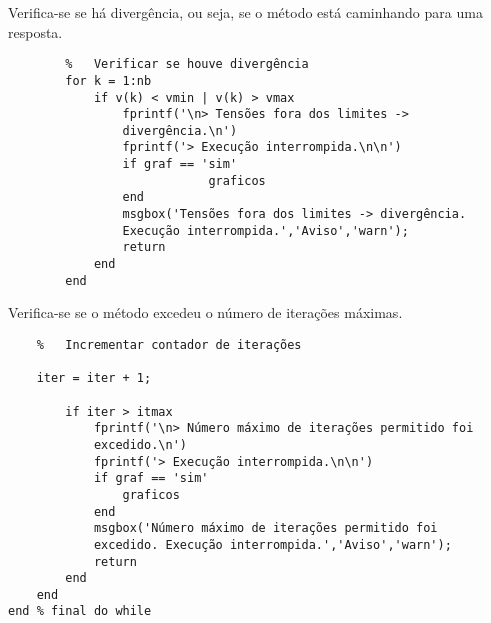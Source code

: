 Verifica-se se há divergência, ou seja, se o método está caminhando para uma resposta. 
\begin{verbatim}
        %	Verificar se houve divergência
        for k = 1:nb
            if v(k) < vmin | v(k) > vmax
                fprintf('\n> Tensões fora dos limites ->
                divergência.\n')
                fprintf('> Execução interrompida.\n\n')
                if graf == 'sim'
                            graficos
                end
                msgbox('Tensões fora dos limites -> divergência.
                Execução interrompida.','Aviso','warn');
                return
            end
        end
\end{verbatim}
Verifica-se se o método excedeu o número de iterações máximas.
\begin{verbatim}
    %	Incrementar contador de iterações

    iter = iter + 1;

        if iter > itmax
            fprintf('\n> Número máximo de iterações permitido foi
            excedido.\n')
            fprintf('> Execução interrompida.\n\n')
            if graf == 'sim'
                graficos
            end
            msgbox('Número máximo de iterações permitido foi
            excedido. Execução interrompida.','Aviso','warn');
            return
        end
    end
end	% final do while
\end{verbatim}
